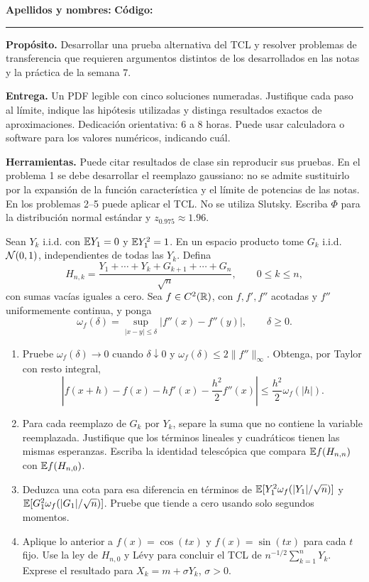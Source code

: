 

\textbf{Apellidos y nombres:} \hrulefill\quad \textbf{Código:} \rule{27mm}{0.4pt}

\textbf{Propósito.} Desarrollar una prueba alternativa del TCL y resolver problemas de transferencia que requieren argumentos distintos de los desarrollados en las notas y la práctica de la semana 7.

\textbf{Entrega.} Un PDF legible con cinco soluciones numeradas. Justifique cada paso al límite, indique las hipótesis utilizadas y distinga resultados exactos de aproximaciones. Dedicación orientativa: 6 a 8 horas. Puede usar calculadora o software para los valores numéricos, indicando cuál.

\textbf{Herramientas.} Puede citar resultados de clase sin reproducir sus pruebas. En el problema 1 se debe desarrollar el reemplazo gaussiano: no se admite sustituirlo por la expansión de la función característica y el límite de potencias de las notas. En los problemas 2--5 puede aplicar el TCL. No se utiliza Slutsky. Escriba $\Phi$ para la distribución normal estándar y $z_{0.975}\approx1.96$.

Sean $Y_k$ i.i.d. con $\mathbb E Y_1=0$ y $\mathbb E Y_1^2=1$. En un espacio producto tome $G_k$ i.i.d. $\mathcal N(0,1)$, independientes de todas las $Y_k$. Defina
\[
H_{n,k}=\frac{Y_1+\cdots+Y_k+G_{k+1}+\cdots+G_n}{\sqrt n},
\qquad 0\le k\le n,
\]
con sumas vacías iguales a cero. Sea $f\in C^2(\mathbb R)$, con $f,f',f''$ acotadas y $f''$ uniformemente continua, y ponga
\[
\omega_f(\delta)=
\sup_{|x-y|\le\delta}|f''(x)-f''(y)|,\qquad \delta\ge0.
\]
\begin{enumerate}
\item Pruebe $\omega_f(\delta)\to0$ cuando $\delta\downarrow0$ y
$\omega_f(\delta)\le2\|f''\|_\infty$. Obtenga, por Taylor con resto integral,
\[
\left|f(x+h)-f(x)-hf'(x)-\frac{h^2}{2}f''(x)\right|
\le\frac{h^2}{2}\omega_f(|h|).
\] 
\item Para cada reemplazo de $G_k$ por $Y_k$, separe la suma que no contiene la variable reemplazada. Justifique que los términos lineales y cuadráticos tienen las mismas esperanzas. Escriba la identidad telescópica que compara $\mathbb E f(H_{n,n})$ con $\mathbb E f(H_{n,0})$. 
\item Deduzca una cota para esa diferencia en términos de
$\mathbb E[Y_1^2\omega_f(|Y_1|/\sqrt n)]$ y
$\mathbb E[G_1^2\omega_f(|G_1|/\sqrt n)]$.
Pruebe que tiende a cero usando solo segundos momentos. 
\item Aplique lo anterior a $f(x)=\cos(tx)$ y $f(x)=\sin(tx)$ para cada $t$ fijo. Use la ley de $H_{n,0}$ y Lévy para concluir el TCL de $n^{-1/2}\sum_{k=1}^nY_k$. Exprese el resultado para $X_k=m+\sigma Y_k$, $\sigma>0$. 
\end{enumerate}

